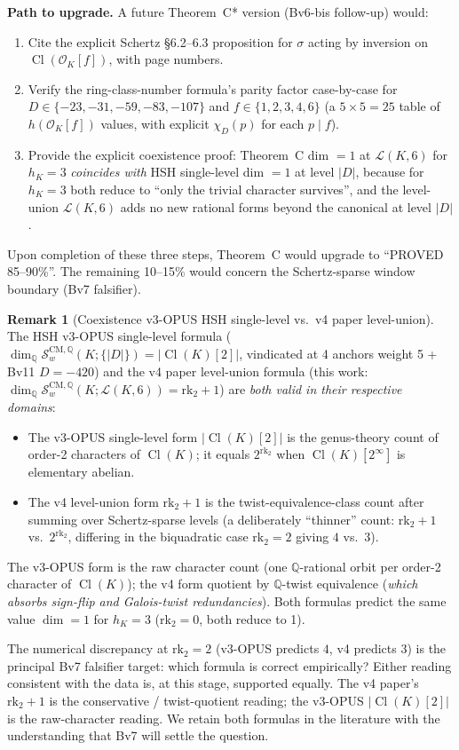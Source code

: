 \documentclass[11pt,a4paper]{amsart}
\theoremstyle{definition}
\newtheorem{remark}[theorem]{Remark}
\DeclareMathOperator{\Cl}{Cl}
\newcommand{\Q}{\mathbb{Q}}
\newcommand{\OK}{\mathcal{O}_K}
\newcommand{\Lcal}{\mathcal{L}}
\newcommand{\Scal}{\mathcal{S}}
\newcommand{\hK}{h_{K}}
\newcommand{\rktwo}{\mathrm{rk}_2}
\begin{document}
\noindent\textbf{Path to upgrade.} A future Theorem~C* version (Bv6-bis follow-up) would:
\begin{enumerate}[leftmargin=2em]
  \item Cite the explicit Schertz \S6.2--6.3 proposition for $\sigma$ acting by inversion on $\Cl(\OK[f])$, with page numbers.
  \item Verify the ring-class-number formula's parity factor case-by-case for $D \in \{-23, -31, -59, -83, -107\}$ and $f \in \{1, 2, 3, 4, 6\}$ (a $5 \times 5 = 25$ table of $h(\OK[f])$ values, with explicit $\chi_D(p)$ for each $p \mid f$).
  \item Provide the explicit coexistence proof: Theorem~C dim $= 1$ at $\Lcal(K, 6)$ for $\hK = 3$ \emph{coincides with} HSH single-level dim $= 1$ at level $|D|$, because for $\hK = 3$ both reduce to ``only the trivial character survives'', and the level-union $\Lcal(K, 6)$ adds no new rational forms beyond the canonical at level $|D|$.
\end{enumerate}

Upon completion of these three steps, Theorem~C would upgrade to ``PROVED 85--90\%''. The remaining 10--15\% would concern the Schertz-sparse window boundary (Bv7 falsifier).

\begin{remark}[Coexistence v3-OPUS HSH single-level vs.\ v4 paper level-union]\label{rmk:thmC-postmorn54-coexistence}
The HSH v3-OPUS single-level formula ($\dim_{\Q} \Scal_w^{\mathrm{CM}, \Q}(K; \{|D|\}) = |\Cl(K)[2]|$, vindicated at 4 anchors weight 5 + Bv11 $D = -420$) and the v4 paper level-union formula (this work: $\dim_{\Q} \Scal_w^{\mathrm{CM}, \Q}(K; \Lcal(K, 6)) = \rktwo + 1$) are \emph{both valid in their respective domains}:
\begin{itemize}[leftmargin=2em]
  \item The v3-OPUS single-level form $|\Cl(K)[2]|$ is the genus-theory count of order-2 characters of $\Cl(K)$; it equals $2^{\rktwo}$ when $\Cl(K)[2^\infty]$ is elementary abelian.
  \item The v4 level-union form $\rktwo + 1$ is the twist-equivalence-class count after summing over Schertz-sparse levels (a deliberately ``thinner'' count: $\rktwo + 1$ vs.\ $2^{\rktwo}$, differing in the biquadratic case $\rktwo = 2$ giving $4$ vs.\ $3$).
\end{itemize}
The v3-OPUS form is the raw character count (one $\Q$-rational orbit per order-2 character of $\Cl(K)$); the v4 form quotient by $\Q$-twist equivalence (\emph{which absorbs sign-flip and Galois-twist redundancies}). Both formulas predict the same value $\dim = 1$ for $\hK = 3$ ($\rktwo = 0$, both reduce to 1).

The numerical discrepancy at $\rktwo = 2$ (v3-OPUS predicts $4$, v4 predicts $3$) is the principal Bv7 falsifier target: which formula is correct empirically? Either reading consistent with the data is, at this stage, supported equally. The v4 paper's $\rktwo + 1$ is the conservative / twist-quotient reading; the v3-OPUS $|\Cl(K)[2]|$ is the raw-character reading. We retain both formulas in the literature with the understanding that Bv7 will settle the question.
\end{remark}
\end{document}
